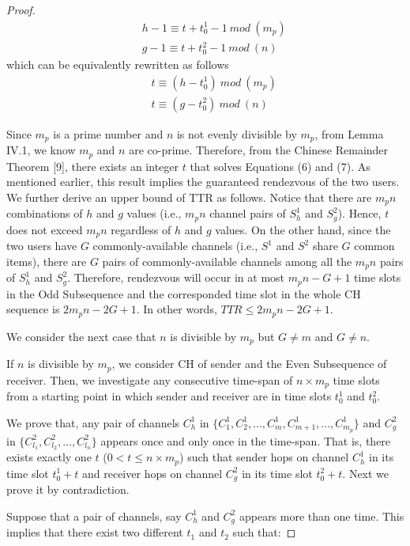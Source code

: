 \documentclass[journal]{IEEEtran}
\begin{document}
\begin{proof}
\begin{eqnarray}
&&h-1\equiv t+t_0^1-1~mod~(m_p)\\
&&g-1\equiv t+t_0^2-1~mod~(n)
\end{eqnarray}
which can be equivalently rewritten as follows
\begin{eqnarray}
&&t\equiv (h-t_0^1)~mod~(m_p)\\
&&t\equiv (g-t_0^2)~mod~(n)
\end{eqnarray}
\par Since $m_p$ is a prime number and $n$ is not evenly divisible by $m_p$, from Lemma IV.1, we know $m_p$ and $n$ are co-prime. Therefore, from the Chinese Remainder Theorem [9], there exists an integer $t$ that solves Equations (6) and (7). As mentioned earlier, this result implies the guaranteed rendezvous of the two users. We further derive an upper bound of TTR as follows. Notice that there are $m_pn$ combinations of $h$ and $g$ values (i.e., $m_pn$ channel pairs of $S_h^1$ and $S_g^2$). Hence, $t$ does not exceed $m_pn$ regardless of $h$ and $g$ values. On the other hand, since the two users have $G$ commonly-available channels (i.e., $S^1$ and $S^2$ share $G$ common items), there are $G$ pairs of commonly-available channels among all the $m_pn$ pairs of $S_h^1$ and $S_g^2$. Therefore, rendezvous will occur in at most $m_pn-G+1$ time slots in the Odd Subsequence and the corresponded time slot in the whole CH sequence is $2m_pn-2G+1$. In other words, $TTR\leq 2m_pn-2G+1$.
\par We consider the next case that $n$ is divisible by $m_p$ but $G\neq m$ and $G\neq n$.
\par If $n$ is divisible by $m_p$, we consider CH of sender and the Even Subsequence of receiver. Then, we investigate any consecutive time-span of $n\times m_p$ time slots from a starting point in which sender and receiver are in time slots $t_0^1$ and $t_0^2$.
\par We prove that, any pair of channels $C_h^1$ in $\{C_1^1, C_2^1, ...,C_m^1, C_{m+1}^1, ..., C_{m_p}^1\}$ and $C_g^2$ in $\{C_{l_1}^2, C_{l_2}^2, ..., C_{l_n}^2\}$ appears once and only once in the time-span. That is, there exists exactly one $t$ ($0<t\leq n\times m_p$) such that sender hops on channel $C_h^1$ in its time slot $t_0^1+t$ and receiver hops on channel $C_g^2$ in its time slot $t_0^2+t$. Next we prove it by contradiction.
\par Suppose that a pair of channels, say $C_h^1$ and $C_g^2$ appears more than one time. This implies that there exist two different $t_1$ and $t_2$ such that:

\end{proof}
\end{document}
